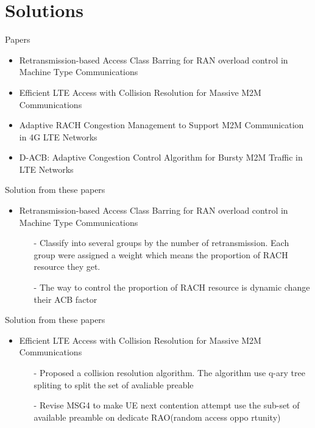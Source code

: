 \documentclass{beamer}
\begin{document}
\section{Solutions}
\begin{frame} {Papers} 
    \begin{itemize}
        \item {Retransmission-based Access Class Barring for RAN overload control in Machine Type Communications}\cite{RACB}
        \item {Efficient LTE Access with Collision Resolution for Massive M2M Communications} \cite{TRAO}
        \item {Adaptive RACH Congestion Management to Support M2M Communication in 4G LTE Networks} \cite{ARC}
        \item {D-ACB: Adaptive Congestion Control Algorithm for Bursty M2M Traffic in LTE Networks} \cite{DACB}
    \end{itemize}
\end{frame}

\begin{frame}{Solution from these papers}
    \begin{itemize}
        \item {Retransmission-based Access Class Barring for RAN overload control in Machine Type Communications}\cite{RACB}
        \begin{itemize}
            \item [-]{Classify into several groups by the number of retransmission. Each group were assigned a weight which means the proportion of RACH resource they get.}
           \item [-]{The way to control the proportion of RACH resource is dynamic change their ACB factor}
        \end{itemize}
    \end{itemize}
\end{frame}

\begin{frame}{Solution from these papers}
    \begin{itemize}
        \item {Efficient LTE Access with Collision Resolution for Massive M2M Communications}
        \begin{itemize}
            \item [-]{Proposed a collision resolution algorithm. The algorithm use q-ary tree spliting to split the set of avaliable preable}
            \item [-]{Revise MSG4 to make UE next contention attempt use the sub-set of available preamble on dedicate RAO(random access oppo
            rtunity)}
        \end{itemize}
    \end{itemize}
\end{frame}
\end{document}
